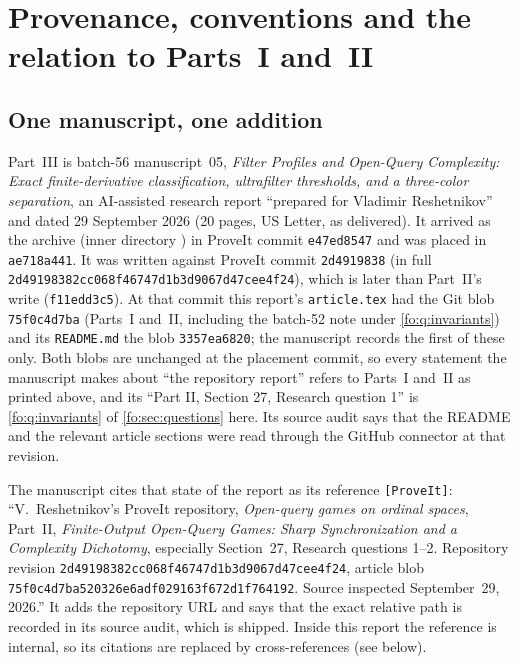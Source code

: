\documentclass[11pt,letterpaper]{article}
\numberwithin{equation}{section}
\theoremstyle{definition}
\theoremstyle{remark}
\theoremstyle{definition}
\begin{document}
\section{Provenance, conventions and the relation to Parts~I and~II}
\label{fp:sec:provenance}

\subsection{One manuscript, one addition}
\label{fp:sec:source}
Part~III is batch-56 manuscript~05, \emph{Filter Profiles and Open-Query
Complexity: Exact finite-derivative classification, ultrafilter thresholds,
and a three-color separation}, an AI-assisted research report ``prepared for
Vladimir Reshetnikov'' and dated 29 September 2026 (20 pages, US Letter, as
delivered). It arrived as the archive
 (inner directory
) in ProveIt commit \texttt{e47ed8547} and was
placed in \texttt{ae718a441}. It was written against ProveIt commit
\texttt{2d4919838} (in full \texttt{2d49198382cc068f46747d1b3d9067d47cee4f24}),
which is later than Part~II's write (\texttt{f11edd3c5}). At that commit this
report's \texttt{article.tex} had the Git blob \texttt{75f0c4d7ba} (Parts~I
and~II, including the batch-52 note under \cref{fo:q:invariants}) and its
\texttt{README.md} the blob \texttt{3357ea6820}; the manuscript records the
first of these only. Both blobs are unchanged at the placement commit, so
every statement the manuscript makes about ``the repository report'' refers
to Parts~I and~II as printed above, and its ``Part II, Section 27, Research
question 1'' is \cref{fo:q:invariants} of \cref{fo:sec:questions} here. Its
source audit says that the README and the relevant article sections were
read through the GitHub connector at that revision.

The manuscript cites that state of the report as its reference
\texttt{[ProveIt]}: ``V.~Reshetnikov's ProveIt repository, \emph{Open-query
games on ordinal spaces}, Part~II, \emph{Finite-Output Open-Query Games: Sharp
Synchronization and a Complexity Dichotomy}, especially Section~27, Research
questions 1--2. Repository revision
\texttt{2d49198382cc068f46747d1b3d9067d47cee4f24}, article blob
\texttt{75f0c4d7ba520326e6adf029163f672d1f764192}. Source inspected
September~29, 2026.'' It adds the repository URL and says that the exact
relative path is recorded in its source audit, which is shipped. Inside this
report the reference is internal, so its citations are replaced by
cross-references (see below).
\end{document}

